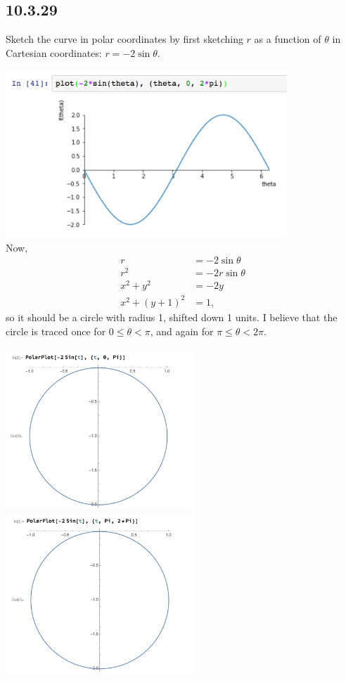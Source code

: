 \subsection*{10.3.29}
Sketch the curve in polar coordinates by first sketching $r$ as a function of
$\theta$ in Cartesian coordinates: $r = -2\sin\theta$.
\begin{mdframed}
  \includegraphics[width=300pt]{img/10-3-29-1.png}\\
  Now,
  \begin{align*}
    r &= -2\sin\theta\\
    r^2 &= -2r\sin\theta\\
    x^2 + y^2 &= -2y\\
    x^2 + (y+1)^2 &= 1,
  \end{align*}
  so it should be a circle with radius 1, shifted down 1 units. I believe that
  the circle is traced once for $0 \leq \theta < \pi$, and again for
  $\pi \leq \theta < 2\pi$.\\\\
  \includegraphics[width=200pt]{img/10-3-29-2.png}
  \includegraphics[width=200pt]{img/10-3-29-3.png}
  \\
\end{mdframed}

